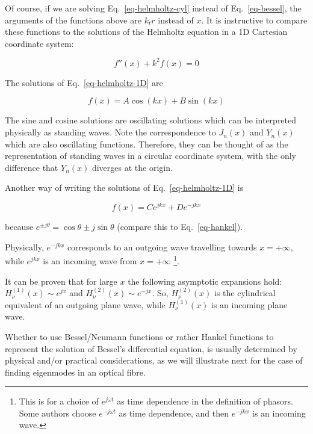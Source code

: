 Of course, if we are solving Eq.~\ref{eq-helmholtz-cyl} instead of Eq.~\ref{eq-bessel}, the arguments of the functions above are $k_t r$ instead of $x$. It is instructive to compare these functions to the solutions of the Helmholtz equation in a 1D Cartesian coordinate system:

\begin{equation}
f''(x) + k^2 f(x) = 0 \label{eq-helmholtz-1D}
\end{equation} 

The solutions of Eq.~\ref{eq-helmholtz-1D} are

\begin{equation}
f(x) = A \cos(kx) + B \sin(kx)
\end{equation} 

The sine and cosine solutions are oscillating solutions which can be interpreted physically as standing waves. Note the correspondence to $J_n(x)$ and $Y_n(x)$ which are also oscillating functions. Therefore, they can be thought of as the representation of standing waves in a circular coordinate system, with the only difference that $Y_n(x)$ diverges at the origin.

Another way of writing the solutions of Eq.~\ref{eq-helmholtz-1D} is

\begin{equation}
f(x) = C e^{jkx} + D e^{-jkx}
\end{equation} 

because $e^{\pm j \theta} = \cos \theta \pm j \sin \theta$ (compare this to Eq.~\ref{eq-hankel}).

Physically, $e^{-jkx}$ corresponds to an outgoing wave travelling towards $x=+\infty$, while $e^{jkx}$ is an incoming wave from $x=+\infty$ \footnote{This is for a choice of $e^{j \omega t}$ as time dependence in the definition of phasors. Some authors choose $e^{-j \omega t}$ as time dependence, and then $e^{-jkx}$ is an incoming wave.}.

It can be proven that for large $x$ the following asymptotic expansions hold:
$H_{\nu}^{(1)}(x) \sim e^{jx}$ and  $H_{\nu}^{(2)}(x) \sim e^{-jx}$. So, $H_{\nu}^{(2)}(x)$ is the cylindrical equivalent of an outgoing plane wave, while $H_{\nu}^{(1)}(x)$ is an incoming plane wave.

Whether to use Bessel/Neumann functions or rather Hankel functions to represent the solution of Bessel's differential equation, is usually determined by physical and/or practical considerations, as we will illustrate next for the case of finding eigenmodes in an optical fibre.

